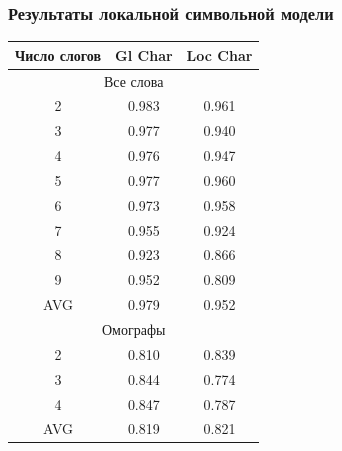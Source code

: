 \documentclass[russian]{beamer}
\begin{document}
\begin{frame}
\frametitle{Результаты локальной символьной модели}
\begin{table}[H]	
	\begin{small}
		\begin{center}
			\begin{tabular}{|c|c|c|}
				\hline
				Число слогов & Gl Char & Loc Char \\ \hline
								\multicolumn{3}{|c|}{Все слова}                      \\ \hline
				
				2       &       0.983       &      0.961       \\ \hline
				3       &       0.977       &      0.940       \\ \hline
				4       &       0.976       &      0.947       \\ \hline
				5       &       0.977       &      0.960       \\ \hline
				6       &       0.973       &      0.958       \\ \hline
				7       &       0.955       &      0.924       \\ \hline
				8       &       0.923       &      0.866       \\ \hline
				9       &       0.952       &      0.809       \\ \hline
				AVG    &       0.979       &      0.952       \\ \hline
								\multicolumn{3}{|c|}{Омографы}                      \\ \hline
				
				2       &       0.810       &      0.839       \\ \hline
				3       &       0.844       &      0.774       \\ \hline
				4       &       0.847       &      0.787       \\ \hline
				AVG    &       0.819       &      0.821       \\ \hline
			\end{tabular}
		\end{center}
	\end{small}
\end{table}	
\end{frame}
\end{document}
